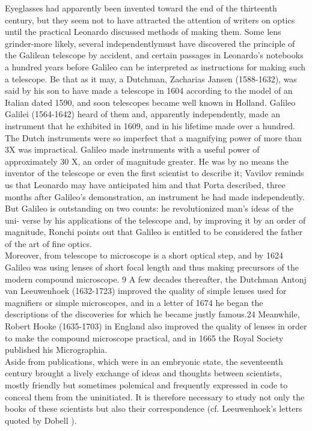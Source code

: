            Eyeglasses had apparently been invented toward the end of the thirteenth century, but they seem not to have attracted the attention of writers on optics until the practical Leonardo discussed methods of making them. Some lens grinder-more likely, several independentlymust have discovered the principle of the Galilean telescope by accident, and certain passages in Leonardo's notebooks a hundred years before Galileo can be interpreted as instructions for making such a telescope. Be that as it may, a Dutchman, Zacharias Jansen (1588-1632), was said by his son to have made a telescope in 1604 according to the model of an Italian dated 1590, and soon telescopes became well known in Holland. Galileo Galilei (1564-1642) heard of them and, apparently independently, made an instrument that he exhibited in 1609, and in his lifetime made over a hundred. The Dutch instruments were so imperfect that a magnifying power of more than 3X was impractical. Galileo made instruments with a useful power of approximately 30 X, an order of magnitude greater. He was by no means the inventor of the telescope or even the first scientist to describe it; Vavilov reminds us that Leonardo may have anticipated him and that Porta described, three months after Galileo's demonstration, an instrument he had made independently. But Galileo is outstanding on two counts: he revolutionized man's ideas of the uni- verse by his applications of the telescope and, by improving it by an order of magnitude, Ronchi points out that Galileo is entitled to be considered the father of the art of fine optics.\\

            Moreover, from telescope to microscope is a short optical step, and by 1624 Galileo was using lenses of short focal length and thus making precursors of the modern compound microscope. 9 A few decades thereafter, the Dutchman Antonj van Leeuwenhoek (1632-1723) improved the quality of simple lenses used for magnifiers or simple microscopes, and in a letter of 1674 he began the descriptions of the discoveries for which he became justly famous.24 Meanwhile, Robert Hooke (1635-1703) in England also improved the quality of lenses in order to make the compound microscope practical, and in 1665 the Royal Society published his Micrographia.\\

            Aside from publications, which were in an embryonic state, the seventeenth century brought a lively exchange of ideas and thoughts between scientists, mostly friendly but sometimes polemical and frequently expressed in code to conceal them from the uninitiated. It is therefore necessary to study not only the books of these scientists but also their correspondence (cf. Leeuwenhoek's letters quoted by Dobell ).
            
